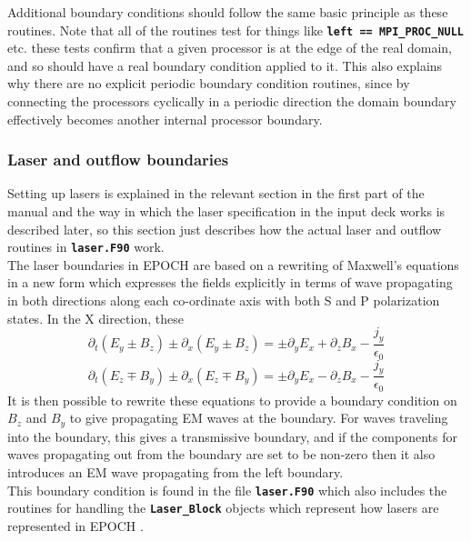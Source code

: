 \documentclass[12pt]{article}
\newcommand{\inlinecode}[1]{{\color{warwickred} \bf\texttt{#1}}}
\newcommand{\EPOCH}{{\color{warwickdark}\fontfamily{phv}\selectfont EPOCH} }
\begin{document}
Additional boundary conditions should follow the same basic principle as these
routines. Note that all of the routines test for things like \inlinecode{left
== MPI\_PROC\_NULL} etc. these tests confirm that a given processor is at the
edge of the real domain, and so should have a real boundary condition applied
to it. This also explains why there are no explicit periodic boundary condition
routines, since by connecting the processors cyclically in a periodic direction
the domain boundary effectively becomes another internal processor boundary.

\subsubsection{Laser and outflow boundaries}
Setting up lasers is explained in the relevant section in the first part of the
manual and the way in which the laser specification in the input deck works is
described later, so this section just describes how the actual laser and
outflow routines in \inlinecode{laser.F90} work. \\

The laser boundaries in \EPOCH are based on a rewriting of Maxwell's equations
in a new form which expresses the fields explicitly in terms of wave
propagating in both directions along each co-ordinate axis with both S and P
polarization states. In the X direction, these
\[
\partial_t(E_y \pm B_z) \pm \partial_x(E_y \pm B_z) = \pm \partial_yE_x
+ \partial_zB_x -\frac{j_y}{\epsilon_0}
\]
\[
\partial_t(E_z \mp B_y) \pm \partial_x(E_z \mp B_y) = \pm \partial_yE_x
- \partial_zB_x -\frac{j_y}{\epsilon_0}
\]
It is then possible to rewrite these equations to provide a boundary condition
on $B_z$ and $B_y$ to give propagating EM waves at the boundary. For waves
traveling into the boundary, this gives a transmissive boundary, and if the
components for waves propagating out from the boundary are set to be non-zero
then it also introduces an EM wave propagating from the left boundary.\\

This boundary condition is found in the file \inlinecode{laser.F90} which also
includes the routines for handling the \inlinecode{Laser\_Block} objects which
represent how lasers are represented in \EPOCH.
\end{document}
